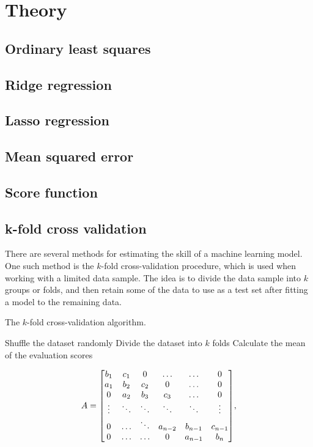 \section{Theory}
\label{sec:theory}

\subsection{Ordinary least squares}

\subsection{Ridge regression}
	
\subsection{Lasso regression}

\subsection{Mean squared error}

\subsection{Score function}

\subsection{k-fold cross validation}
There are several methods for estimating the skill of a machine learning model. One such method is the $k$-fold cross-validation procedure, which is used when working with a limited data sample. The idea is to divide the data sample into $k$ groups or folds, and then retain some of the data to use as a test set after fitting a model to the remaining data.  

\begin{algorithm}[htbp]\label{alg:met}\caption{The $k$-fold cross-validation algorithm.}
	\SetAlgoLined
	\BlankLine
	\BlankLine
	Shuffle the dataset randomly\;
	Divide the dataset into $k$ folds\;
	Calculate the mean of the evaluation scores\;	
	\BlankLine
	\BlankLine
\end{algorithm}


\[A =
\mqty[b_1 & c_1 & 0 & \hdots & \hdots & 0 \\
a_1 & b_2 & c_2 & 0 & \hdots & 0 \\
0 & a_2 & b_3 & c_3 & \hdots & 0 \\
\vdots & \ddots & \ddots & \ddots & \ddots & \vdots \\
0 & \hdots & \ddots & a_{n-2} & b_{n-1} & c_{n-1} \\
0 & \hdots & \hdots & 0 & a_{n-1} & b_n],
\]